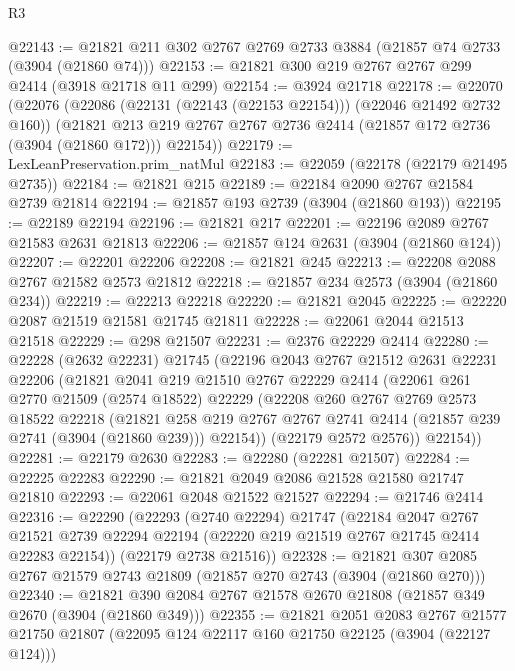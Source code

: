 \begin{lexlean}{R3}
\begin{coremodule}
@22143 := @21821 @211 @302 @2767 @2769 @2733 @3884 (@21857 @74 @2733 (@3904 (@21860 @74)))
@22153 := @21821 @300 @219 @2767 @2767 @299 @2414 (@3918 @21718 @11 @299)
@22154 := @3924 @21718
@22178 := @22070
    (@22076
      (@22086 (@22131 (@22143 (@22153 @22154))) (@22046 @21492 @2732 @160))
      (@21821 @213 @219 @2767 @2767 @2736 @2414 (@21857 @172 @2736 (@3904 (@21860 @172))) @22154))
@22179 := LexLeanPreservation.prim_natMul
@22183 := @22059 (@22178 (@22179 @21495 @2735))
@22184 := @21821 @215
@22189 := @22184 @2090 @2767 @21584 @2739 @21814
@22194 := @21857 @193 @2739 (@3904 (@21860 @193))
@22195 := @22189 @22194
@22196 := @21821 @217
@22201 := @22196 @2089 @2767 @21583 @2631 @21813
@22206 := @21857 @124 @2631 (@3904 (@21860 @124))
@22207 := @22201 @22206
@22208 := @21821 @245
@22213 := @22208 @2088 @2767 @21582 @2573 @21812
@22218 := @21857 @234 @2573 (@3904 (@21860 @234))
@22219 := @22213 @22218
@22220 := @21821 @2045
@22225 := @22220 @2087 @21519 @21581 @21745 @21811
@22228 := @22061 @2044 @21513 @21518
@22229 := @298 @21507
@22231 := @2376 @22229 @2414
@22280 := @22228
    (@2632 @22231)
    @21745
    (@22196
      @2043
      @2767
      @21512
      @2631
      @22231
      @22206
      (@21821
        @2041
        @219
        @21510
        @2767
        @22229
        @2414
        (@22061
          @261
          @2770
          @21509
          (@2574 @18522)
          @22229
          (@22208
            @260
            @2767
            @2769
            @2573
            @18522
            @22218
            (@21821
              @258
              @219
              @2767
              @2767
              @2741
              @2414
              (@21857 @239 @2741 (@3904 (@21860 @239)))
              @22154))
          (@22179 @2572 @2576))
        @22154))
@22281 := @22179 @2630
@22283 := @22280 (@22281 @21507)
@22284 := @22225 @22283
@22290 := @21821 @2049 @2086 @21528 @21580 @21747 @21810
@22293 := @22061 @2048 @21522 @21527
@22294 := @21746 @2414
@22316 := @22290
    (@22293
      (@2740 @22294)
      @21747
      (@22184
        @2047
        @2767
        @21521
        @2739
        @22294
        @22194
        (@22220 @219 @21519 @2767 @21745 @2414 @22283 @22154))
      (@22179 @2738 @21516))
@22328 := @21821 @307 @2085 @2767 @21579 @2743 @21809 (@21857 @270 @2743 (@3904 (@21860 @270)))
@22340 := @21821 @390 @2084 @2767 @21578 @2670 @21808 (@21857 @349 @2670 (@3904 (@21860 @349)))
@22355 := @21821
    @2051
    @2083
    @2767
    @21577
    @21750
    @21807
    (@22095 @124 @22117 @160 @21750 @22125 (@3904 (@22127 @124)))

\end{coremodule}
\end{lexlean}
